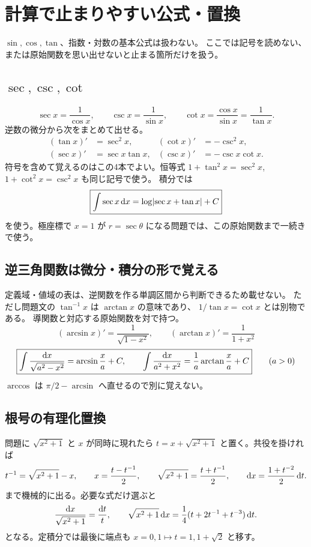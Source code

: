 \chapter{計算で止まりやすい公式・置換}
\label{ch:tb-functions}

$\sin,\cos,\tan$、指数・対数の基本公式は扱わない。
ここでは記号を読めない、または原始関数を思い出せないと止まる箇所だけを扱う。

\section{\texorpdfstring{$\sec,\csc,\cot$}{sec, csc, cot}}

\[
\sec x=\frac1{\cos x},\qquad
\csc x=\frac1{\sin x},\qquad
\cot x=\frac{\cos x}{\sin x}=\frac1{\tan x}.
\]
逆数の微分から次をまとめて出せる。
\[
\boxed{
\begin{aligned}
(\tan x)'&=\sec^2x,&
(\cot x)'&=-\csc^2x,\\
(\sec x)'&=\sec x\tan x,&
(\csc x)'&=-\csc x\cot x.
\end{aligned}}
\]
符号を含めて覚えるのはこの4本でよい。恒等式
$1+\tan^2x=\sec^2x$, $1+\cot^2x=\csc^2x$ も同じ記号で使う。
積分では
\[
\boxed{\int\sec x\,\mathrm{d} x=\log\lvert \sec x+\tan x \rvert+C}
\]
を使う。極座標で $x=1$ が $r=\sec\theta$ になる問題では、この原始関数まで一続きで使う。

\section{逆三角関数は微分・積分の形で覚える}

定義域・値域の表は、逆関数を作る単調区間から判断できるため載せない。
ただし問題文の $\tan^{-1}x$ は $\arctan x$ の意味であり、
$1/\tan x=\cot x$ とは別物である。
導関数と対応する原始関数を対で持つ。
\[
\boxed{
(\arcsin x)'=\frac1{\sqrt{1-x^2}},\qquad
(\arctan x)'=\frac1{1+x^2}}
\]
\[
\boxed{
\int\frac{\mathrm{d} x}{\sqrt{a^2-x^2}}=\arcsin\frac xa+C,
\qquad
\int\frac{\mathrm{d} x}{a^2+x^2}=\frac1a\arctan\frac xa+C
}\qquad(a>0)
\]
$\arccos$ は $\pi/2-\arcsin$ へ直せるので別に覚えない。

\section{根号の有理化置換}

問題に $\sqrt{x^2+1}$ と $x$ が同時に現れたら
$t=x+\sqrt{x^2+1}$ と置く。共役を掛ければ
\[
t^{-1}=\sqrt{x^2+1}-x,
\qquad
x=\frac{t-t^{-1}}2,
\qquad
\sqrt{x^2+1}=\frac{t+t^{-1}}2,
\qquad
\mathrm{d} x=\frac{1+t^{-2}}2\,\mathrm{d} t.
\]
まで機械的に出る。必要な式だけ選ぶと
\[
\frac{\mathrm{d} x}{\sqrt{x^2+1}}=\frac{\mathrm{d} t}{t},
\qquad
\sqrt{x^2+1}\,\mathrm{d} x
=\frac14(t+2t^{-1}+t^{-3})\,\mathrm{d} t.
\]
となる。定積分では最後に端点も $x=0,1\mapsto t=1,1+\sqrt2$ と移す。
